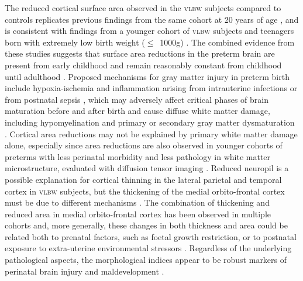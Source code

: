 The reduced cortical surface area observed in the \textsc{vlbw} subjects compared to controls replicates previous findings from the same cohort at 20 years of age \citep{Skranes2013}, and is consistent with findings from a younger cohort of \textsc{vlbw} subjects \citep{Solsnes2015} and teenagers born with extremely low birth weight ($\leqslant$~1000g) \citep{Grunewaldt2014}. The combined evidence from these studies suggests that surface area reductions in the preterm brain are present from early childhood and remain reasonably constant from childhood until adulthood \citep{Rimol2016}. Proposed mechanisms for gray matter injury in preterm birth include hypoxia-ischemia and inflammation arising from intrauterine infections or from postnatal sepsis \citep{Volpe2009, Volpe2011}, which may adversely affect critical phases of brain maturation before and after birth and cause diffuse white matter damage, including hypomyelination and primary or secondary gray matter dysmaturation \citep{Hagberg2015}. Cortical area reductions may not be explained by primary white matter damage alone, especially since area reductions are also observed in younger cohorts of preterms with less perinatal morbidity and less pathology in white matter microstructure, evaluated with diffusion tensor imaging \citep{Eikenes2011,Rimol2016}. Reduced neuropil is a possible explanation for cortical thinning in the lateral parietal and temporal cortex in \textsc{vlbw} subjects, but the thickening of the medial orbito-frontal cortex must be due to different mechanisms \citep{Marin-Padilla1997, Bjuland2013, Grunewaldt2014}. The combination of thickening and reduced area in medial orbito-frontal cortex has been observed in multiple cohorts and, more generally, these changes in both thickness and area could be related both to prenatal factors, such as foetal growth restriction, or to postnatal exposure to extra-uterine environmental stressors \citep{Solsnes2015, Rimol2016}. Regardless of the underlying pathological aspects, the morphological indices appear to be robust markers of perinatal brain injury and maldevelopment \citep{Raznahan2011, Skranes2013, Rimol2016}.
